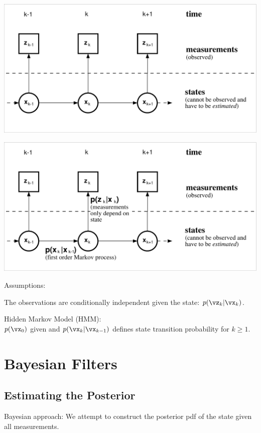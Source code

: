 \documentclass[english,pdftex]{article}
\begin{document}
\newpage
\includegraphics[width=.99\textwidth]{BucSystem5}


\newpage
\includegraphics[width=.99\textwidth]{BucSystem6}

Assumptions:

The observations are conditionally independent given the state:
$p(\vz_k|\vx_k)$.

Hidden Markov Model (HMM):\\
$p(\vx_0)$ given and $p(\vx_k|\vx_{k-1})$ defines state transition probability for $k \ge 1$.


\newpage
{}




\section{Bayesian Filters}


\subsection{Estimating the Posterior}

Bayesian approach: We attempt to construct the posterior pdf of
the state given all measurements.
\end{document}
